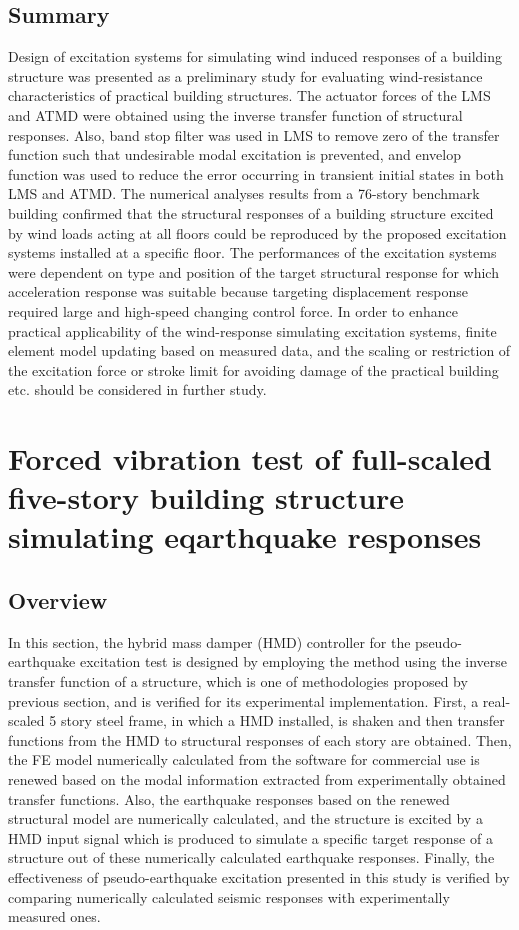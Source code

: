 \subsection{Summary}
Design of excitation systems for simulating wind induced responses of a building structure was presented as a preliminary study for evaluating wind-resistance characteristics of practical building structures. The actuator forces of the LMS and ATMD were obtained using the inverse transfer function of structural responses. Also, band stop filter was used in LMS to remove zero of the transfer function such that undesirable modal excitation is prevented, and envelop function was used to reduce the error occurring in transient initial states in both LMS and ATMD. The numerical analyses results from a 76-story benchmark building confirmed that the structural responses of a building structure excited by wind loads acting at all floors could be reproduced by the proposed excitation systems installed at a specific floor. The performances of the excitation systems were dependent on type and position of the target structural response for which acceleration response was suitable because targeting displacement response required large and high-speed changing control force. In order to enhance practical applicability of the wind-response simulating excitation systems, finite element model updating based on measured data, and the scaling or restriction of the excitation force or stroke limit for avoiding damage of the practical building etc. should be considered in further study.






\section{Forced vibration test of full-scaled five-story building structure simulating eqarthquake responses}
\label{chap:7}
\subsection{Overview}


In this section, the hybrid mass damper (HMD) controller for the pseudo-earthquake excitation test is designed by employing the method using the inverse transfer function of a structure, which is one of methodologies proposed by previous section, and is verified for its experimental implementation. First, a real-scaled 5 story steel frame, in which a HMD installed, is shaken and then transfer functions from the HMD to structural responses of each story are obtained. Then, the FE model numerically calculated from the software for commercial use is renewed based on the modal information extracted from experimentally obtained transfer functions. Also, the earthquake responses based on the renewed structural model are numerically calculated, and the structure is excited by a HMD input signal which is produced to simulate a specific target response of a structure out of these numerically calculated earthquake responses. Finally, the effectiveness of pseudo-earthquake excitation presented in this study is verified by comparing numerically calculated seismic responses with experimentally measured ones.


